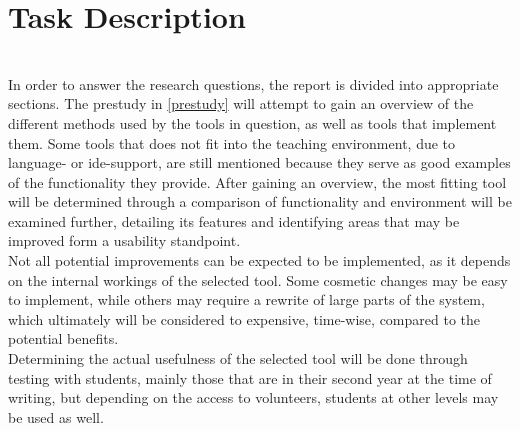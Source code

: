 \chapter{Task Description}\label{Task Description}%
~\\
In order to answer the research questions, the report is divided into appropriate sections.
The prestudy in \autoref{prestudy} will attempt to gain an overview of the different methods used by the tools in question, as well as tools that implement them.
Some tools that does not fit into the teaching environment, due to language- or \gls{ide}-support, are still mentioned because they serve as good examples of the functionality they provide.
After gaining an overview, the most fitting tool will be determined through a comparison of functionality and environment will be examined further, detailing its features and identifying areas that may be improved form a usability standpoint.
~\\

Not all potential improvements can be expected to be implemented, as it depends on the internal workings of the selected tool.
Some cosmetic changes may be easy to implement, while others may require a rewrite of large parts of the system, which ultimately will be considered to expensive, time-wise, compared to the potential benefits.
~\\

Determining the actual usefulness of the selected tool will be done through testing with students, mainly those that are in their second year at the time of writing, but depending on the access to volunteers, students at other levels may be used as well.
~\\